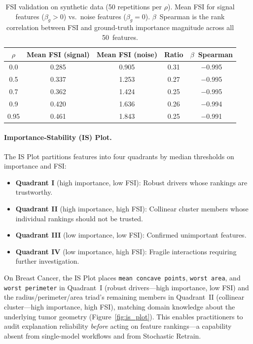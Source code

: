 \documentclass[10pt]{article}
\newcommand{\rhovar}{\rho}
\begin{document}
\begin{table}[htbp]
\centering
\caption{FSI validation on synthetic data (50 repetitions per $\rhovar$).
Mean FSI for signal features ($\beta_g > 0$) vs.\ noise features
($\beta_g = 0$).  $\beta$~Spearman is the rank correlation between FSI
and ground-truth importance magnitude across all 50~features.}
\label{tab:fsi_validation}
\small
\begin{tabular}{ccccc}
\toprule
$\rhovar$ & Mean FSI (signal) & Mean FSI (noise) & Ratio & $\beta$~Spearman \\
\midrule
0.0  & 0.285 & 0.905 & 0.31 & $-$0.995 \\
0.5  & 0.337 & 1.253 & 0.27 & $-$0.995 \\
0.7  & 0.362 & 1.424 & 0.25 & $-$0.995 \\
0.9  & 0.420 & 1.636 & 0.26 & $-$0.994 \\
0.95 & 0.461 & 1.843 & 0.25 & $-$0.991 \\
\bottomrule
\end{tabular}
\end{table}

\paragraph{Importance-Stability (IS) Plot.}
The IS Plot partitions features into four quadrants by median
thresholds on importance and FSI:
\begin{itemize}
  \item \textbf{Quadrant I} (high importance, low FSI): Robust
    drivers whose rankings are trustworthy.
  \item \textbf{Quadrant II} (high importance, high FSI): Collinear
    cluster members whose individual rankings should not be trusted.
  \item \textbf{Quadrant III} (low importance, low FSI): Confirmed
    unimportant features.
  \item \textbf{Quadrant IV} (low importance, high FSI): Fragile
    interactions requiring further investigation.
\end{itemize}

On Breast Cancer, the IS Plot places \texttt{mean concave points},
\texttt{worst area}, and \texttt{worst perimeter} in Quadrant~I
(robust drivers---high importance, low FSI) and the
radius/perimeter/area triad's remaining members in Quadrant~II
(collinear cluster---high importance, high FSI), matching
domain knowledge about the underlying tumor geometry
(Figure~\ref{fig:is_plot}). This enables practitioners to audit
explanation reliability \emph{before} acting on feature rankings---a
capability absent from single-model workflows and from Stochastic
Retrain.
\end{document}
